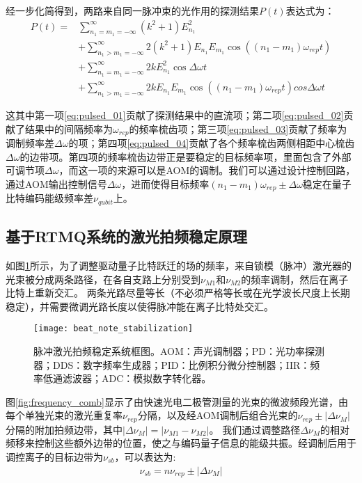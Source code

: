 经一步化简得到，两路来自同一脉冲束的光作用的探测结果$P(t)$表达式为：
\begin{align}
    P(t)=&\sum_{n_1=m_1=-\infty}^{\infty}(k^2+1)E_{n_1}^2\label{eq:pulsed_01}\\
    &+\sum_{n_1>m_1=-\infty}^{\infty}2(k^2+1)E_{n_1}E_{m_1}\cos\left((n_1-m_1)\omega_{rep}t\right)\label{eq:pulsed_02}\\
    &+\sum_{n_1=m_1=-\infty}^{\infty}2kE_{n_1}^2\cos\Delta\omega t\label{eq:pulsed_03}\\
    &+\sum_{n_1>m_1=-\infty}^{\infty}2kE_{n_1}E_{m_1}\cos\left((n_1-m_1)\omega_{rep}t\right)cos\Delta\omega t\label{eq:pulsed_04}
\end{align}

这其中第一项\eqref{eq:pulsed_01}贡献了探测结果中的直流项；第二项\eqref{eq:pulsed_02}贡献了结果中的间隔频率为$\omega_{rep}$的频率梳齿项；第三项\eqref{eq:pulsed_03}贡献了频率为调制频率差$\Delta\omega$的项；第四项\eqref{eq:pulsed_04}贡献了各个频率梳齿两侧相距中心梳齿$\Delta\omega$的边带项。第四项的频率梳齿边带正是要稳定的目标频率项，里面包含了外部可调节项$\Delta\omega$，而这一项的来源可以是AOM的调制。我们可以通过设计控制回路，通过AOM输出控制信号$\Delta\omega$，进而使得目标频率$(n_1-m_1)\omega_{rep}\pm \Delta\omega$稳定在量子比特编码能级频率差$\nu_{qubit}$上。

\subsection[基于RTMQ系统的激光拍频稳定原理]{基于RTMQ系统的激光拍频稳定原理}

如图\ref{fig:beat_note_stabilization}所示，为了调整驱动量子比特跃迁的场的频率，来自锁模（脉冲）激光器的光束被分成两条路径，在各自支路上分别受到$\nu_{M1}$和$\nu_{M2}$的频率调制，然后在离子比特上重新交汇。
两条光路尽量等长（不必须严格等长或在光学波长尺度上长期稳定），并需要微调光路长度以使得脉冲能在离子比特处交汇。

\begin{figure}
    \centering
    \texttt{[image: beat\_note\_stabilization]}
    \caption[脉冲激光拍频稳定系统框图]{脉冲激光拍频稳定系统框图。AOM：声光调制器；PD：光功率探测器；DDS：数字频率生成器；PID：比例积分微分控制器；IIR：频率低通滤波器；ADC：模拟数字转化器。\label{fig:beat_note_stabilization}}
\end{figure}

图\ref{fig:frequency_comb}显示了由快速光电二极管测量的光束的微波频段光谱，由每个单独光束的激光重复率$\nu_{rep}$分隔，以及经AOM调制后组合光束的$\nu_{rep}\pm |\Delta \nu_M|$分隔的附加拍频边带，其中$|\Delta \nu_M|=|\nu_{M1}-\nu_{M2}|$。
我们通过调整路径$\Delta\nu_M$的相对频移来控制这些额外边带的位置，使之与编码量子信息的能级共振。经调制后用于调控离子的目标边带为$\nu_{sb}$，可以表达为:
\begin{align}
    \nu_{sb}=n\nu_{rep}\pm|\Delta\nu_M|
\end{align}

